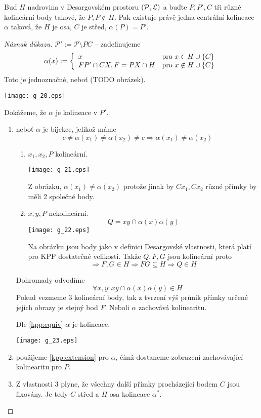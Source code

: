 \begin{theorem}[Baerova]\label{kpp:baer}
    Buď $H$ nadrovina v Desargovském prostoru $(\mathcal{P},\operatorname{\mathcal{L}})$ a buďte $P,P', C$ tři různé kolineární body takové, že $P,P\not\in H$.
    Pak existuje právě jedna centrální kolineace $\alpha$ taková, že $H$ je osa, $C$ je střed, $\alpha(P)=P'$.
\end{theorem}
\begin{proof}[Náznak důkazu]
    $\mathcal{P}':=\mathcal{P}\setminus PC$ -- zadefinujeme
    \[ \alpha(x) := \left\{ \begin{array}{ll} x & \mbox{pro } x\in H\cup \{C\} \\ FP'\cap CX, F=PX\cap H & \mbox{pro } x\not\in H\cup \{C\} \end{array} \right. \]
    Toto je jednoznačné, neboť (TODO obrázek).

    \texttt{[image: g\_20.eps]}

    Dokážeme, že $\alpha$ je kolineace v $P'$.
    \begin{enumerate}
	    \item neboť $\alpha$ je bijekce, jelikož máme
		    \[ c\neq \alpha(x_1)\neq\alpha(x_2)\neq c\Rightarrow \alpha(x_1)\neq\alpha(x_2) \]
    		\begin{enumerate}
			\item $x_1, x_2, P$ kolineární.

    \texttt{[image: g\_21.eps]}

    Z obrázku, $\alpha(x_1)\neq\alpha(x_2)$ protože jinak by $Cx_1, Cx_2$ různé přímky by měli 2 společné body.
			\item $x, y, P$ nekolineární.
				\[ Q = xy \cap \alpha(x)\alpha(y) \]
    \texttt{[image: g\_22.eps]}

    			Na obrázku jsou body jako v definici Desargovské vlastnosti, která platí pro KPP dostatečné velikosti.
			Takže $Q, F, G$ jsou kolineární proto
			\[ \Rightarrow F, G \in H \Rightarrow FG \subseteq H \Rightarrow Q \in H\]

    		\end{enumerate}

		Dohromady odvodíme
		\[ \forall x, y: xy \cap \alpha(x)\alpha(y) \in H \]
		Pokud vezmeme 3 kolineární body, tak z tvrzení výš průnik přímky určené jejích obrazy je stejný bod $F$. Neboli $\alpha$ zachovává kolinearitu.

		Dle \cref{kpp:equiv} $\alpha$ je kolineace.

    \texttt{[image: g\_23.eps]}

	\item použijeme \cref{kpp:extension} pro $\alpha$, čímž dostaneme zobrazení zachovávající kolinearitu pro $P$.
	\item Z vlastnosti 3 plyne, že všechny další přímky procházející bodem $C$ jsou fixovány.
		Je tedy $C$ střed a $H$ osa kolineace $\alpha^*$.
    \end{enumerate}
\end{proof}

